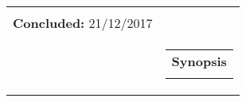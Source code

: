 \begin{titlepage}
\begin{nopagebreak}
{\begin{tabular}{cc}
{\textbf{Pages:}\\

%
\textbf{Concluded:} 21/12/2017\\

\vfill } &
\parbox{7cm}{
  \vspace{.15cm}
  \hfill
  \begin{tabular}{l}
  {\textbf{Synopsis}}\bigskip \\
  \fbox{
    \parbox{6.5cm}{\bigskip
     {\vfill{\small 
     \bigskip}}
     }}
   \end{tabular}}
\end{tabular}} \vspace{1cm}


\end{nopagebreak}
\end{titlepage}
%